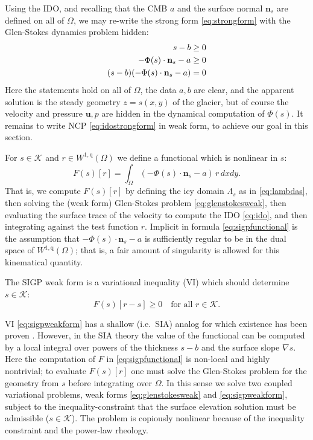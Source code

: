 \documentclass[letterpaper,final,12pt,reqno]{amsart}
\theoremstyle{claim}
\newcommand{\grad}{\nabla}
\newcommand{\bn}{\mathbf{n}}
\newcommand{\bu}{\mathbf{u}}
\newcommand{\qq}{{\text{q}}}
\numberwithin{equation}{section}
\numberwithin{figure}{section}
\numberwithin{table}{section}
\numberwithin{theorem}{section}
\begin{document}
Using the IDO, and recalling that the CMB $a$ and the surface normal $\bn_s$ are defined on all of $\Omega$, we may re-write the strong form \eqref{eq:strongform} with the Glen-Stokes dynamics problem hidden:
\begin{align}
s - b &\ge 0  \label{eq:idostrongform} \\
- \Phi(s) \cdot \bn_s - a &\ge 0 \notag \\
(s - b) (- \Phi(s) \cdot \bn_s - a) &= 0 \notag
\end{align}
Here the statements hold on all of $\Omega$, the data $a,b$ are clear, and the apparent solution is the steady geometry $z=s(x,y)$ of the glacier, but of course the velocity and pressure $\bu,p$ are hidden in the dynamical computation of $\Phi(s)$.  It remains to write NCP \eqref{eq:idostrongform} in weak form, to achieve our goal in this section.

For $s \in \mathcal{K}$ and $r \in W^{1,\qq}(\Omega)$ we define a functional which is nonlinear in $s$:
\begin{equation}
F(s)[r] = \int_\Omega (- \Phi(s) \cdot \bn_s - a)\, r \,dx dy. \label{eq:sigpfunctional}
\end{equation}
That is, we compute $F(s)[r]$ by defining the icy domain $\Lambda_s$ as in \eqref{eq:lambdas}, then solving the (weak form) Glen-Stokes problem \eqref{eq:glenstokesweak}, then evaluating the surface trace of the velocity to compute the IDO \eqref{eq:ido}, and then integrating against the test function $r$.  Implicit in formula \eqref{eq:sigpfunctional} is the assumption that $- \Phi(s) \cdot \bn_s - a$ is sufficiently regular to be in the dual space of $W^{1,\qq}(\Omega)$; that is, a fair amount of singularity is allowed for this kinematical quantity.

The SIGP weak form is a variational inequality (VI) \cite{KinderlehrerStampacchia1980} which should determine $s\in\mathcal{K}$:
\begin{equation}
F(s)[r - s] \ge 0 \quad \text{for all $r \in \mathcal{K}$.}  \label{eq:sigpweakform}
\end{equation}

VI \eqref{eq:sigpweakform} has a shallow (i.e.~SIA) analog for which existence has been proven \cite{JouvetBueler2012}.  However, in the SIA theory the value of the functional can be computed by a local integral over powers of the thickness $s-b$ and the surface slope $\grad s$.  Here the computation of $F$ in \eqref{eq:sigpfunctional} is non-local and highly nontrivial; to evaluate $F(s)[r]$ one must solve the Glen-Stokes problem for the geometry from $s$ before integrating over $\Omega$.  In this sense we solve two coupled variational problems, weak forms \eqref{eq:glenstokesweak} and \eqref{eq:sigpweakform}, subject to the inequality-constraint that the surface elevation solution must be admissible ($s \in \mathcal{K}$).  The problem is copiously nonlinear because of the inequality constraint and the power-law rheology.
\end{document}
